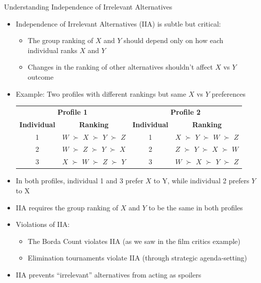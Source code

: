 \documentclass[10pt,handout]{beamer}
\begin{document}
\begin{frame}{Understanding Independence of Irrelevant Alternatives}
  \begin{itemize}
    \item Independence of Irrelevant Alternatives (IIA) is subtle but critical:
      \begin{itemize}
        \item The group ranking of $X$ and $Y$ should depend only on how each individual ranks $X$ and $Y$
        \item Changes in the ranking of other alternatives shouldn't affect $X$ vs $Y$ outcome
      \end{itemize}
    \item Example: Two profiles with different rankings but same $X$ vs $Y$ preferences
      \begin{table}
        \center
        \begin{tabular}{cccc}
          \toprule
          \multicolumn{2}{c}{\textbf{Profile 1}} & \multicolumn{2}{c}{\textbf{Profile 2}} \\
          \textbf{Individual} & \textbf{Ranking} & \textbf{Individual} & \textbf{Ranking} \\
          \midrule
          1 & $W$ $\succ$ $X$ $\succ$ $Y$ $\succ$ $Z$ & 1 & $X$ $\succ$ $Y$ $\succ$ $W$ $\succ$ $Z$ \\
          2 & $W$ $\succ$ $Z$ $\succ$ $Y$ $\succ$ $X$ & 2 & $Z$ $\succ$ $Y$ $\succ$ $X$ $\succ$ $W$ \\
          3 & $X$ $\succ$ $W$ $\succ$ $Z$ $\succ$ $Y$ & 3 & $W$ $\succ$ $X$ $\succ$ $Y$ $\succ$ $Z$ \\
          \bottomrule
        \end{tabular}
      \end{table}
    \item In both profiles, individual 1 and 3 prefer $X$ to Y, while individual 2 prefers $Y$ to X
    \item IIA requires the group ranking of $X$ and $Y$ to be the same in both profiles
    \item Violations of IIA:
      \begin{itemize}
        \item The Borda Count violates IIA (as we saw in the film critics example)
        \item Elimination tournaments violate IIA (through strategic agenda-setting)
      \end{itemize}
    \item IIA prevents ``irrelevant'' alternatives from acting as spoilers
  \end{itemize}
\end{frame}
\end{document}
